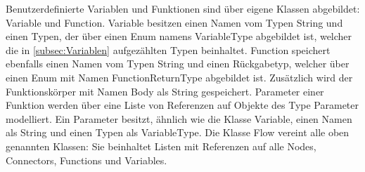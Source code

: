\newline
Benutzerdefinierte Variablen und Funktionen sind über eigene Klassen abgebildet: Variable und Function. Variable besitzen einen Namen vom Typen String und einen Typen, der über einen Enum namens VariableType abgebildet ist, welcher die in \ref{subsec:Variablen} aufgezählten Typen beinhaltet. Function speichert ebenfalls einen Namen vom Typen String und einen Rückgabetyp, welcher über einen Enum mit Namen FunctionReturnType abgebildet ist. Zusätzlich wird der Funktionskörper mit Namen Body als String gespeichert. Parameter einer Funktion werden über eine Liste von Referenzen auf Objekte des Type Parameter modelliert. Ein Parameter besitzt, ähnlich wie die Klasse Variable, einen Namen als String und einen Typen als VariableType. Die Klasse Flow vereint alle oben genannten Klassen: Sie beinhaltet Listen mit Referenzen auf alle Nodes, Connectors, Functions und Variables. 

